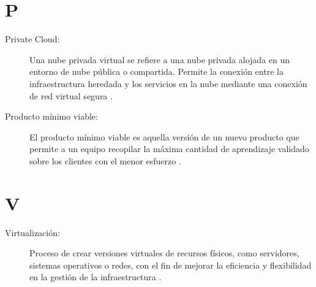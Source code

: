 \section*{P}
\begin{description}
  \item[Private Cloud:] Una nube privada virtual se refiere a una nube privada alojada en un entorno de nube pública o compartida. Permite la conexión entre la infraestructura heredada y los servicios en la nube mediante una conexión de red virtual segura \citep{Collins2016}.
  
  \item[Producto mínimo viable:] El producto mínimo viable es aquella versión de un nuevo producto que permite a un equipo recopilar la máxima cantidad de aprendizaje validado sobre los clientes con el menor esfuerzo \citep{Ries2020}.
\end{description}

\section*{V}
\begin{description}
  \item[Virtualización:] Proceso de crear versiones virtuales de recursos físicos, como servidores, sistemas operativos o redes, con el fin de mejorar la eficiencia y flexibilidad en la gestión de la infraestructura \citep{Meena2021}.
\end{description}